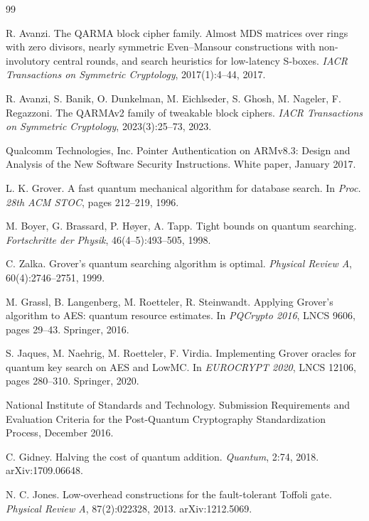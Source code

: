 \documentclass[runningheads,10pt]{llncs}
\begin{document}
\begin{thebibliography}{99}

 R. Avanzi. The QARMA block cipher family. Almost MDS matrices over rings with zero divisors, nearly symmetric Even--Mansour constructions with non-involutory central rounds, and search heuristics for low-latency S-boxes. \emph{IACR Transactions on Symmetric Cryptology}, 2017(1):4--44, 2017.

 R. Avanzi, S. Banik, O. Dunkelman, M. Eichlseder, S. Ghosh, M. Nageler, F. Regazzoni. The QARMAv2 family of tweakable block ciphers. \emph{IACR Transactions on Symmetric Cryptology}, 2023(3):25--73, 2023.

 Qualcomm Technologies, Inc. Pointer Authentication on ARMv8.3: Design and Analysis of the New Software Security Instructions. White paper, January 2017.

 L. K. Grover. A fast quantum mechanical algorithm for database search. In \emph{Proc. 28th ACM STOC}, pages 212--219, 1996.

 M. Boyer, G. Brassard, P. H{\o}yer, A. Tapp. Tight bounds on quantum searching. \emph{Fortschritte der Physik}, 46(4--5):493--505, 1998.

 C. Zalka. Grover's quantum searching algorithm is optimal. \emph{Physical Review A}, 60(4):2746--2751, 1999.

 M. Grassl, B. Langenberg, M. Roetteler, R. Steinwandt. Applying Grover's algorithm to AES: quantum resource estimates. In \emph{PQCrypto 2016}, LNCS 9606, pages 29--43. Springer, 2016.

 S. Jaques, M. Naehrig, M. Roetteler, F. Virdia. Implementing Grover oracles for quantum key search on AES and LowMC. In \emph{EUROCRYPT 2020}, LNCS 12106, pages 280--310. Springer, 2020.

 National Institute of Standards and Technology. Submission Requirements and Evaluation Criteria for the Post-Quantum Cryptography Standardization Process, December 2016.

 C. Gidney. Halving the cost of quantum addition. \emph{Quantum}, 2:74, 2018. arXiv:1709.06648.

 N. C. Jones. Low-overhead constructions for the fault-tolerant Toffoli gate. \emph{Physical Review A}, 87(2):022328, 2013. arXiv:1212.5069.


\end{thebibliography}
\end{document}
